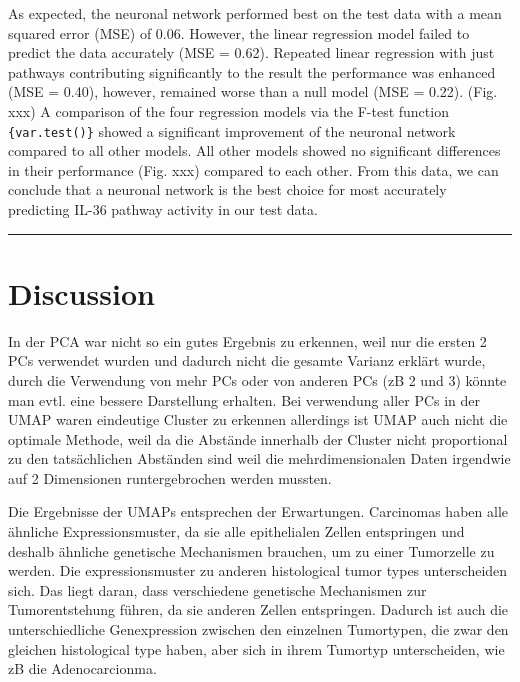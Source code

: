 \documentclass[
  parskip,
  oneside]{scrreprt}
\begin{document}
As expected, the neuronal network performed best on the test data with a
mean squared error (MSE) of 0.06. However, the linear regression model
failed to predict the data accurately (MSE = 0.62). Repeated linear
regression with just pathways contributing significantly to the result
the performance was enhanced (MSE = 0.40), however, remained worse than
a null model (MSE = 0.22). (Fig. xxx) A comparison of the four
regression models via the F-test function \texttt{\{var.test()\}} showed
a significant improvement of the neuronal network compared to all other
models. All other models showed no significant differences in their
performance (Fig. xxx) compared to each other. From this data, we can
conclude that a neuronal network is the best choice for most accurately
predicting IL-36 pathway activity in our test data.

\begin{center}\rule{0.5\linewidth}{0.5pt}\end{center}

\hypertarget{discussion}{%
\chapter{Discussion}\label{discussion}}

In der PCA war nicht so ein gutes Ergebnis zu erkennen, weil nur die
ersten 2 PCs verwendet wurden und dadurch nicht die gesamte Varianz
erklärt wurde, durch die Verwendung von mehr PCs oder von anderen PCs
(zB 2 und 3) könnte man evtl. eine bessere Darstellung erhalten. Bei
verwendung aller PCs in der UMAP waren eindeutige Cluster zu erkennen
allerdings ist UMAP auch nicht die optimale Methode, weil da die
Abstände innerhalb der Cluster nicht proportional zu den tatsächlichen
Abständen sind weil die mehrdimensionalen Daten irgendwie auf 2
Dimensionen runtergebrochen werden mussten.

Die Ergebnisse der UMAPs entsprechen der Erwartungen. Carcinomas haben
alle ähnliche Expressionsmuster, da sie alle epithelialen Zellen
entspringen und deshalb ähnliche genetische Mechanismen brauchen, um zu
einer Tumorzelle zu werden. Die expressionsmuster zu anderen
histological tumor types unterscheiden sich. Das liegt daran, dass
verschiedene genetische Mechanismen zur Tumorentstehung führen, da sie
anderen Zellen entspringen. Dadurch ist auch die unterschiedliche
Genexpression zwischen den einzelnen Tumortypen, die zwar den gleichen
histological type haben, aber sich in ihrem Tumortyp unterscheiden, wie
zB die Adenocarcionma.
\end{document}
